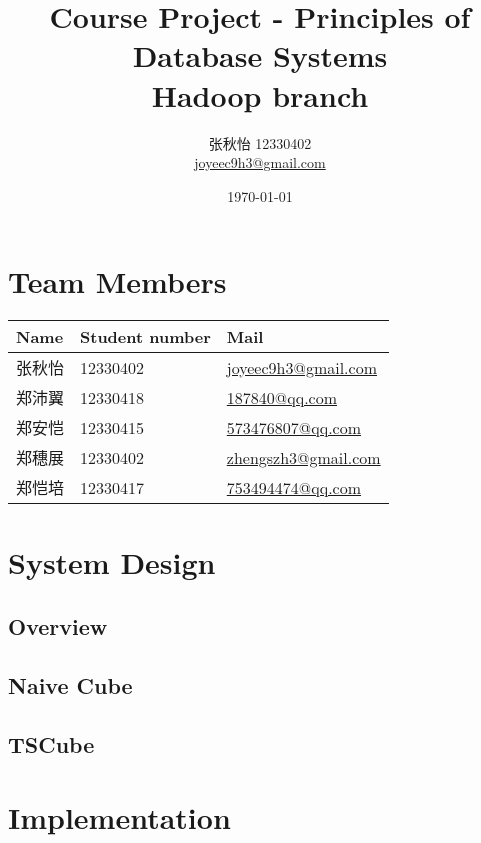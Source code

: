 \documentclass{article}
\begin{document}
\title{Course Project - Principles of Database Systems \\ Hadoop branch}
\author{张秋怡 12330402 \\ \href{mailto:joyeec9h3@gmail.com}{joyeec9h3@gmail.com}} 
\date{\today}
\maketitle

\tableofcontents
\section{Team Members}

\begin{tabular}{l l l}
Name              & Student number & Mail \\
\hline
张秋怡 & 12330402 &  \href{mailto:joyeec9h3@gmail.com}{joyeec9h3@gmail.com}  \\
郑沛翼 & 12330418 &  \href{mailto:187840@qq.com}{187840@qq.com}  \\
郑安恺 & 12330415 &  \href{mailto:573476807@qq.com}{573476807@qq.com}  \\
郑穗展 & 12330402 &  \href{mailto:zhengszh3@gmail.com}{zhengszh3@gmail.com}  \\
郑恺培 & 12330417 &  \href{mailto:753494474@qq.com}{753494474@qq.com}
\end{tabular}

\section{System Design}

\subsection{Overview}

\subsection{Naive Cube}

\subsection{TSCube}

\section{Implementation}
\end{document}
